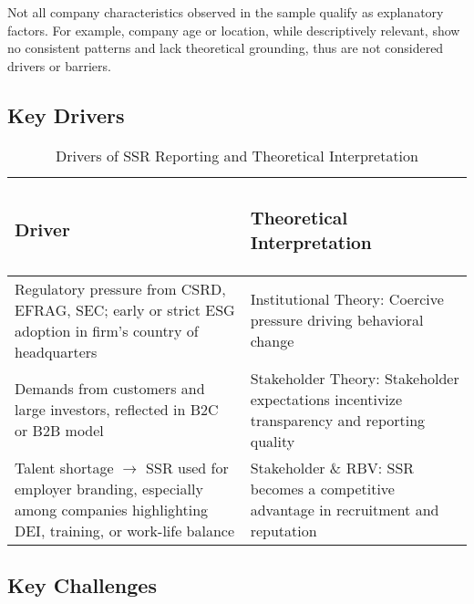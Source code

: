 Not all company characteristics observed in the sample qualify as explanatory factors.
For example, company age or location, while descriptively relevant, show no consistent patterns 
and lack theoretical grounding, thus are not considered drivers or barriers.

\subsection{Key Drivers}
\begin{table}[H]
    \centering
    \caption{Drivers of SSR Reporting and Theoretical Interpretation}
    \begin{tabular}{p{6cm}|p{8cm}}
        \subsubsection{Driver} & \subsubsection{Theoretical Interpretation} \\
        \hline
        Regulatory pressure from CSRD, EFRAG, SEC; early or strict ESG adoption in firm's country of headquarters
         & Institutional Theory: Coercive pressure driving behavioral change \\
        \hline
        Demands from customers and large investors, reflected in B2C or B2B model 
        & Stakeholder Theory: Stakeholder expectations incentivize transparency and reporting quality \\
        \hline
        Talent shortage $\rightarrow$ SSR used for employer branding, especially among companies 
        highlighting DEI, training, or work-life balance 
        & Stakeholder \& RBV: SSR becomes a competitive advantage in recruitment and reputation \\
    \end{tabular}
\end{table}

\subsection{Key Challenges}

